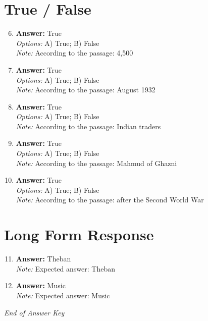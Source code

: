 \documentclass[12pt]{article}
\begin{document}
\section*{True / False}
\begin{enumerate}[label=\arabic*.]
\setcounter{enumi}{5}
\item \textbf{Answer:} True
\\ \textit{Options:} A) True; B) False
\\ \textit{Note:} According to the passage: 4,500
\item \textbf{Answer:} True
\\ \textit{Options:} A) True; B) False
\\ \textit{Note:} According to the passage: August 1932
\item \textbf{Answer:} True
\\ \textit{Options:} A) True; B) False
\\ \textit{Note:} According to the passage: Indian traders
\item \textbf{Answer:} True
\\ \textit{Options:} A) True; B) False
\\ \textit{Note:} According to the passage: Mahmud of Ghazni
\item \textbf{Answer:} True
\\ \textit{Options:} A) True; B) False
\\ \textit{Note:} According to the passage: after the Second World War
\end{enumerate}

\section*{Long Form Response}
\begin{enumerate}[label=\arabic*.]
\setcounter{enumi}{10}
\item \textbf{Answer:} Theban
\\ \textit{Note:} Expected answer: Theban
\item \textbf{Answer:} Music
\\ \textit{Note:} Expected answer: Music
\end{enumerate}

\vfill
\noindent\textit{End of Answer Key}
\end{document}
